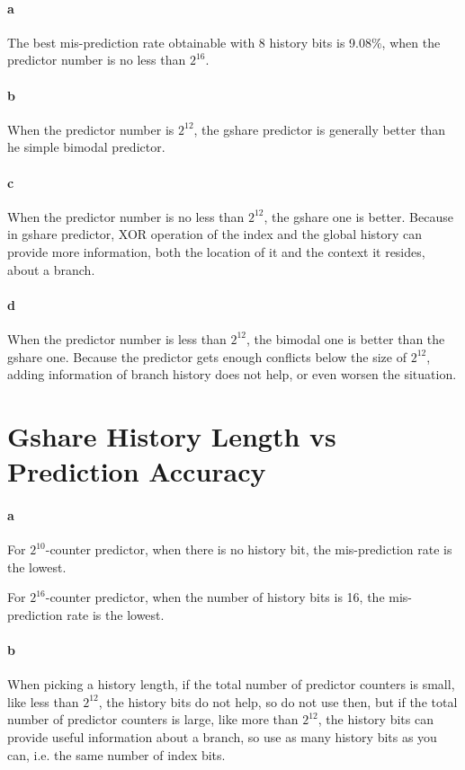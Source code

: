 \documentclass[12pt,letterpaper]{article}
\begin{document}
\paragraph*{a}
The best mis-prediction rate obtainable with 8 history bits is 9.08\%, when
the predictor number is no less than $2^{16}$.

\paragraph*{b}
When the predictor number is $2^{12}$, the gshare predictor is generally better
than he simple bimodal predictor.

\paragraph*{c}
When the predictor number is no less than $2^{12}$, the gshare one is better.
Because in gshare predictor, XOR operation of the index and the global history 
can provide more information, both the location of it and the context it resides,
about a branch.

\paragraph*{d}
When the predictor number is less than $2^{12}$, the bimodal one is better 
than the gshare one. Because the predictor gets enough conflicts below the size
of $2^12$, adding information of branch history does not help, or even worsen
the situation.

\section{Gshare History Length vs Prediction Accuracy}
\paragraph*{a}
For $2^{10}$-counter predictor, when there is no history bit, the 
mis-prediction rate is the lowest. 

For $2^16$-counter predictor, when the number of history bits is 16, the
mis-prediction rate is the lowest.

\paragraph*{b}
When picking a history length, if the total number of predictor counters is 
small, like less than $2^{12}$, the history bits do not help, so do not use then,
but if the total number of predictor counters is large, like more than $2^{12}$,
the history bits can provide useful information about a branch, so use as many
history bits as you can, i.e. the same number of index bits. 
\end{document}
